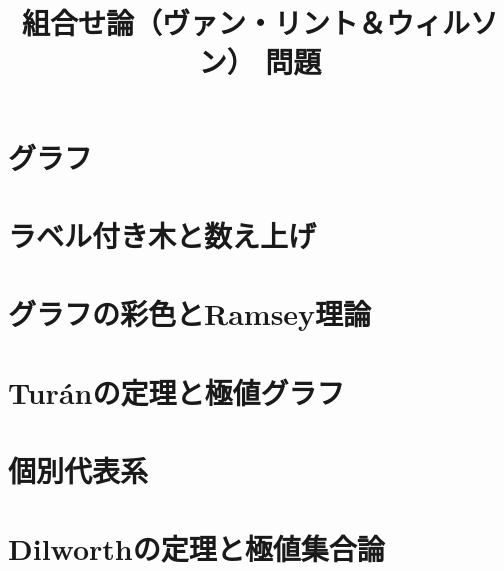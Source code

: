 \documentclass{jarticle}
\title{組合せ論（ヴァン・リント＆ウィルソン） 問題}
\begin{document}
\maketitle

\section{グラフ}











\newpage

\section{ラベル付き木と数え上げ}









\newpage

\section{グラフの彩色とRamsey理論}












\newpage

\section{Tur\'{a}nの定理と極値グラフ}










\newpage

\section{個別代表系}








\newpage

\section{Dilworthの定理と極値集合論}





\end{document}
